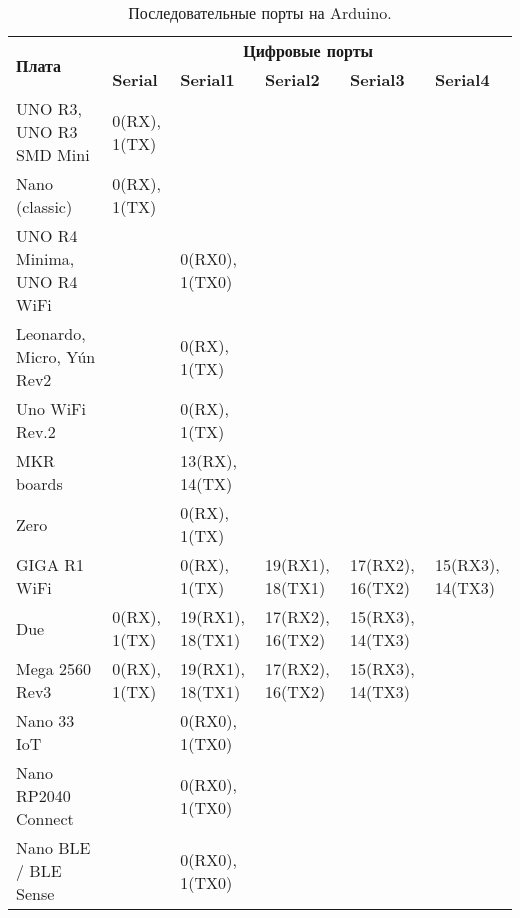 \documentclass[../sparc.tex]{subfiles}
\begin{document}
\begin{table}[h]
\centering
\begin{tabular}{|m{9em}|m{3.5em}|m{3.5em}|m{3.5em}|m{3.5em}|m{3.5em}|}
  \hline
  \multirow{2}{2em}{\textbf{Плата}} & \multicolumn{5}{c|}{\textbf{Цифровые порты}} \\
  \cline{2-6}
   & \textbf{Serial}  & \textbf{Serial1}     & \textbf{Serial2}     & \textbf{Serial3}     & \textbf{Serial4}     \\
\hline
UNO R3, UNO R3 SMD Mini    & 0(RX), 1(TX) &                  &                  &                  &                  \\
\hline
Nano (classic)             & 0(RX), 1(TX) &                  &                  &                  &                  \\
\hline
UNO R4 Minima, UNO R4 WiFi &              & 0(RX0), 1(TX0)   &                  &                  &                  \\
\hline
Leonardo, Micro, Yún Rev2  &              & 0(RX), 1(TX)     &                  &                  &                  \\
\hline
Uno WiFi Rev.2             &              & 0(RX), 1(TX)     &                  &                  &                  \\
\hline
MKR boards                 &              & 13(RX), 14(TX)   &                  &                  &                  \\
\hline
Zero                       &              & 0(RX), 1(TX)     &                  &                  &                  \\
\hline
GIGA R1 WiFi               &              & 0(RX), 1(TX)     & 19(RX1), 18(TX1) & 17(RX2), 16(TX2) & 15(RX3), 14(TX3) \\
\hline
Due                        & 0(RX), 1(TX) & 19(RX1), 18(TX1) & 17(RX2), 16(TX2) & 15(RX3), 14(TX3) &                  \\
\hline
Mega 2560 Rev3             & 0(RX), 1(TX) & 19(RX1), 18(TX1) & 17(RX2), 16(TX2) & 15(RX3), 14(TX3) &                  \\
\hline
Nano 33 IoT                &              & 0(RX0), 1(TX0)   &                  &                  &                  \\
\hline
Nano RP2040 Connect        &              & 0(RX0), 1(TX0)   &                  &                  &                  \\
\hline
Nano BLE / BLE Sense       &              & 0(RX0), 1(TX0)   &                  &                  & \\
\hline
\end{tabular}
\caption{Последовательные порты на Arduino.}
\label{table:serial-ports--pins}
\end{table}
\end{document}
